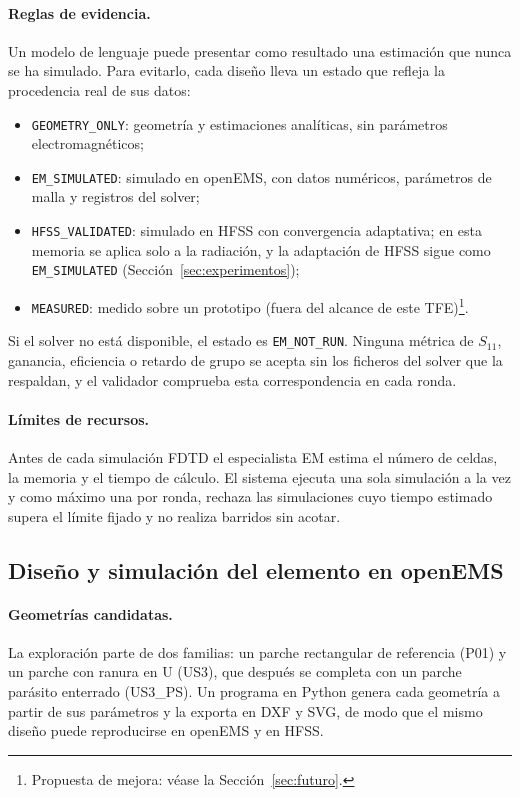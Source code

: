 \documentclass[11pt,a4paper]{article}
\begin{document}
\paragraph{Reglas de evidencia.} Un modelo de lenguaje puede presentar como resultado una
estimación que nunca se ha simulado. Para evitarlo, cada diseño lleva un estado que refleja la
procedencia real de sus datos:
\begin{itemize}
    \item \texttt{GEOMETRY\_ONLY}: geometría y estimaciones analíticas, sin parámetros
    electromagnéticos;
    \item \texttt{EM\_SIMULATED}: simulado en openEMS, con datos numéricos, parámetros de malla y
    registros del solver;
    \item \texttt{HFSS\_VALIDATED}: simulado en HFSS con convergencia adaptativa; en esta memoria se aplica solo a la radiación, y la adaptación de HFSS sigue como \texttt{EM\_SIMULATED} (Sección~\ref{sec:experimentos});
    \item \texttt{MEASURED}: medido sobre un prototipo (fuera del alcance de este TFE)\footnote{Propuesta de mejora: véase la Sección~\ref{sec:futuro}.}.
\end{itemize}
Si el solver no está disponible, el estado es \texttt{EM\_NOT\_RUN}. Ninguna métrica de $S_{11}$,
ganancia, eficiencia o retardo de grupo se acepta sin los ficheros del solver que la respaldan, y
el validador comprueba esta correspondencia en cada ronda.

\paragraph{Límites de recursos.} Antes de cada simulación FDTD el especialista EM estima el
número de celdas, la memoria y el tiempo de cálculo. El sistema ejecuta una sola simulación a la
vez y como máximo una por ronda, rechaza las simulaciones cuyo tiempo estimado supera el límite
fijado y no realiza barridos sin acotar.

\subsection{Diseño y simulación del elemento en openEMS}\label{sec:elemento_openems}
\paragraph{Geometrías candidatas.} La exploración parte de dos familias: un parche rectangular
de referencia (P01) y un parche con ranura en U (US3), que después se completa con un parche
parásito enterrado (US3\_PS). Un
programa en Python genera cada geometría a partir de sus parámetros y la exporta en DXF y SVG, de
modo que el mismo diseño puede reproducirse en openEMS y en HFSS.
\end{document}
